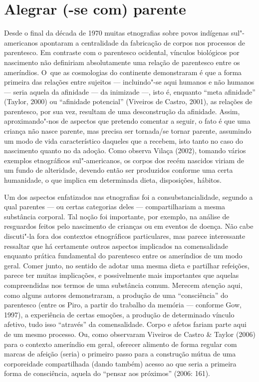 \section{Alegrar (-se com) parente}

Desde o final da década de 1970 muitas etnografias sobre povos indígenas
sul"-americanos apontaram a centralidade da fabricação de corpos nos
processos de parentesco. Em contraste com o parentesco ocidental,
vínculos biológicos por nascimento não definiriam absolutamente uma
relação de parentesco entre os ameríndios. O~que as cosmologias do
continente demonstraram é que a forma primeira das relações entre
sujeitos --- incluindo"-se aqui humanos e não humanos --- seria aquela da
afinidade --- da inimizade ---, isto é, enquanto ``meta afinidade'' (Taylor,
2000) ou ``afinidade potencial'' (Viveiros de Castro, 2001), as relações
de parentesco, por sua vez, resultam de uma desconstrução da afinidade.
Assim, aproximando"-nos de aspectos que pretendo comentar a seguir, o
fato é que uma criança não nasce parente, mas precisa ser tornada/se
tornar parente, assumindo um modo de vida característico daqueles que a
recebem, isto tanto no caso do nascimento quanto no da adoção. Como
observa Vilaça (2002), tomando vários exemplos etnográficos
sul"-americanos, os corpos dos recém nascidos viriam de um fundo de
alteridade, devendo então ser produzidos conforme uma certa humanidade,
o que implica em determinada dieta, disposições, hábitos.

Um dos aspectos enfatizados nas etnografias foi a consubstancialidade,
segundo a qual parentes --- ou certas categorias deles --- compartilhariam
a mesma substância corporal. Tal noção foi importante, por exemplo, na
análise de resguardos feitos pelo nascimento de crianças ou em eventos
de doença. Não cabe discuti"-la fora dos contextos etnográficos
particulares, mas parece interessante ressaltar que há certamente
outros aspectos implicados na comensalidade enquanto prática
fundamental do parentesco entre os ameríndios de um modo geral. Comer
junto, no sentido de adotar uma mesma dieta e partilhar refeições,
parece ter muitas implicações, e possivelmente mais importantes que
aquelas compreendidas nos termos de uma substância comum. Merecem
atenção aqui, como alguns autores demonstraram, a produção de uma
``consciência'' do parentesco (entre os Piro, a partir do trabalho da
memória --- conforme Gow, 1997), a experiência de certas emoções, a
produção de determinado vínculo afetivo, tudo isso ``através'' da
comensalidade. Corpo e afetos fariam parte aqui de um mesmo processo.
Ou, como observaram Viveiros de Castro \& Taylor (2006) para o contexto
ameríndio em geral, oferecer alimento de forma regular com marcas de
afeição (seria) o primeiro passo para a construção mútua de uma
corporeidade compartilhada (dando também) acesso ao que seria a
primeira forma de consciência, aquela do ``pensar aos próximos'' (2006:
161).

